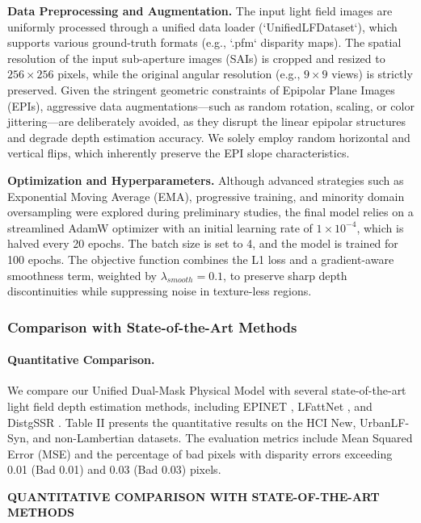 \documentclass[lettersize,journal]{IEEEtran}
\begin{document}
\textbf{Data Preprocessing and Augmentation.} 
The input light field images are uniformly processed through a unified data loader (`UnifiedLFDataset`), which supports various ground-truth formats (e.g., `.pfm` disparity maps). The spatial resolution of the input sub-aperture images (SAIs) is cropped and resized to $256 \times 256$ pixels, while the original angular resolution (e.g., $9 \times 9$ views) is strictly preserved. Given the stringent geometric constraints of Epipolar Plane Images (EPIs), aggressive data augmentations—such as random rotation, scaling, or color jittering—are deliberately avoided, as they disrupt the linear epipolar structures and degrade depth estimation accuracy. We solely employ random horizontal and vertical flips, which inherently preserve the EPI slope characteristics. 

\textbf{Optimization and Hyperparameters.}
Although advanced strategies such as Exponential Moving Average (EMA), progressive training, and minority domain oversampling were explored during preliminary studies, the final model relies on a streamlined AdamW optimizer  with an initial learning rate of $1 \times 10^{-4}$, which is halved every 20 epochs. The batch size is set to 4, and the model is trained for 100 epochs. The objective function combines the L1 loss and a gradient-aware smoothness term, weighted by $\lambda_{smooth} = 0.1$, to preserve sharp depth discontinuities while suppressing noise in texture-less regions.

\subsubsection{Comparison with State-of-the-Art Methods}

\paragraph{Quantitative Comparison.}
We compare our Unified Dual-Mask Physical Model with several state-of-the-art light field depth estimation methods, including EPINET , LFattNet , and DistgSSR . Table II presents the quantitative results on the HCI New, UrbanLF-Syn, and non-Lambertian datasets. The evaluation metrics include Mean Squared Error (MSE) and the percentage of bad pixels with disparity errors exceeding 0.01 (Bad 0.01) and 0.03 (Bad 0.03) pixels.

\textbf{QUANTITATIVE COMPARISON WITH STATE-OF-THE-ART METHODS}
\end{document}
